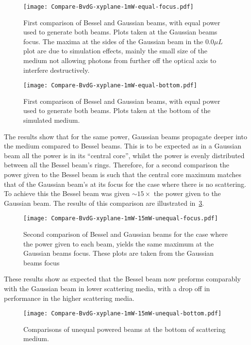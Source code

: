 \begin{figure}[!htbp]
    \centering
    \texttt{[image: Compare-BvdG-xyplane-1mW-equal-focus.pdf]}
    \caption{First comparison of Bessel and Gaussian beams, with equal power used to generate both beams. Plots taken at the Gaussian beams focus. The maxima at the sides of the Gaussian beam in the $0.0\mu L$plot are due to simulation effects, mainly the small size of the medium not allowing photons from further off the optical axis to interfere destructively.}
    \label{fig:1stcomp}
\end{figure}

\begin{figure}[!htbp]
    \centering
    \texttt{[image: Compare-BvdG-xyplane-1mW-equal-bottom.pdf]}
    \caption{First comparison of Bessel and Gaussian beams, with equal power used to generate both beams. Plots taken at the bottom of the simulated medium.}
    \label{fig:1stcomp-1}
\end{figure}

The results show that for the same power, Gaussian beams propagate deeper into the medium compared to Bessel beams.
This is to be expected as in a Gaussian beam all the power is in its ``central core'', whilst the power is evenly distributed between all the Bessel beam's rings.
Therefore, for a second comparison the power given to the Bessel beam is such that the central core maximum matches that of the Gaussian beam's at its focus for the case where there is no scattering.
To achieve this the Bessel beam was given $\sim 15\times$ the power given to the Gaussian beam.
The results of this comparison are illustrated in~\cref{fig:2ndcomp}.

\begin{figure}[!htbp]
    \centering
    \texttt{[image: Compare-BvdG-xyplane-1mW-15mW-unequal-focus.pdf]}
    \caption{Second comparison of Bessel and Gaussian beams for the case where the power given to each beam, yields the same maximum at the Gaussian beams focus. These plots are taken from the Gaussian beams focus}
    \label{fig:2ndcomp}
\end{figure}

These results show as expected that the Bessel beam now preforms comparably with the Gaussian beam in lower scattering media, with a drop off in performance in the higher scattering media.

\begin{figure}[!htpb]
    \centering
    \texttt{[image: Compare-BvdG-xyplane-1mW-15mW-unequal-bottom.pdf]}
    \caption{Comparisons of unequal powered beams at the bottom of scattering medium.}
    \label{fig:2ncompbottom}
\end{figure}

